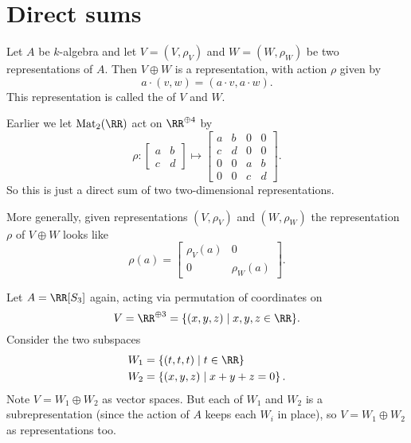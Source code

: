 \section{Direct sums}
\begin{definition}
	Let $A$ be $k$-algebra and let $V = (V, \rho_V)$ and $W = (W, \rho_W)$
	be two representations of $A$.
	Then $V \oplus W$ is a representation, with action $\rho$ given by
	\[ a \cdot (v,w) = (a \cdot v, a \cdot w). \]
	This representation is called the  of $V$ and $W$.
\end{definition}
\begin{example}
	Earlier we let $\Mat_2(\RR)$ act on $\RR^{\oplus 4}$ by
	\[
		\rho : 
		\begin{bmatrix} a & b \\ c & d \end{bmatrix} 
		\mapsto
		\begin{bmatrix} a & b & 0 & 0 \\ c & d & 0 & 0 \\
			0 & 0 & a & b \\ 0 & 0 & c & d \end{bmatrix} .
	\]
	So this is just a direct sum of two two-dimensional representations.
\end{example}
More generally, given representations $(V, \rho_V)$ and $(W, \rho_W)$
the representation $\rho$ of $V \oplus W$ looks like
\[ \rho(a) =
	\begin{bmatrix}
		\rho_V(a) & 0 \\ 0 & \rho_W(a)
	\end{bmatrix}.
\]
\begin{example}
	Let $A = \RR[S_3]$ again,
	acting via permutation of coordinates on
	\[ V = \RR^{\oplus 3} = \{ (x,y,z) \mid x,y,z \in \RR \}. \]
	Consider the two subspaces
	\begin{align*}
		W_1 &= \left\{ (t,t,t) \mid t \in \RR \right\} \\
		W_2 &= \left\{ (x,y,z) \mid x+y+z = 0 \right\}.
	\end{align*}
	Note $V = W_1 \oplus W_2$ as vector spaces.
	But each of $W_1$ and $W_2$ is a subrepresentation
	(since the action of $A$ keeps each $W_i$ in place),
	so $V = W_1 \oplus W_2$ as representations too.
\end{example}

